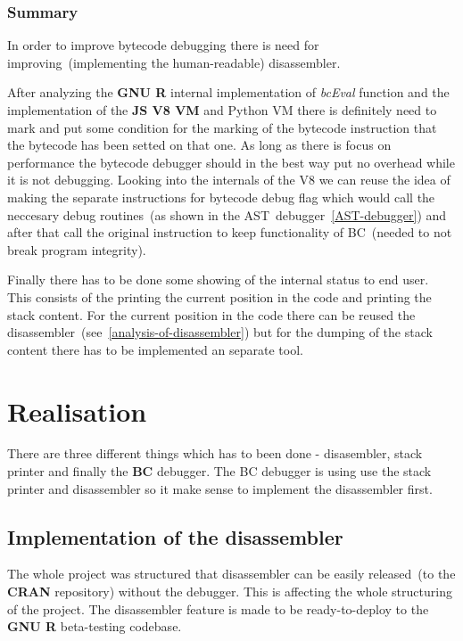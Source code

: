 \documentclass[thesis=M,english]{FITthesis}[2018/10/20]
\begin{document}
\subsection{Summary}

In order to improve bytecode debugging there is need for improving~(implementing the human-readable) disassembler. 

After analyzing the \textbf{GNU R} internal implementation of \textit{bcEval} function and the implementation of the \textbf{JS V8 VM} and Python VM there is definitely need to mark and put some condition for the marking of the bytecode instruction that the bytecode has been setted on that one. As long as there is focus on performance the bytecode debugger should in the best way put no overhead while it is not debugging. Looking into the internals of the V8 we can reuse the idea of making the separate instructions for bytecode debug flag which would call the neccesary debug routines~(as shown in the AST~debugger~\ref{AST-debugger}) and after that call the original instruction to keep functionality of BC~(needed to not break program integrity).

Finally there has to be done some showing of the internal status to end user. This consists of the printing the current position in the code and printing the stack content. For the current position in the code there can be reused the disassembler~(see~\ref{analysis-of-disassembler}) but for the dumping of the stack content there has to be implemented an separate tool.

\chapter{Realisation}

There are three different things which has to been done - disasembler, stack printer and finally the \textbf{BC} debugger. The BC debugger is using use the stack printer and disassembler so it make sense to implement the disassembler first.

\section{Implementation of the disassembler}\label{implementation-of-disassembler}

The whole project was structured that disassembler can be easily released~(to the \textbf{CRAN} repository) without the debugger. This is affecting the whole structuring of the project. The disassembler feature is made to be ready-to-deploy to the \textbf{GNU R} beta-testing codebase.
\end{document}
